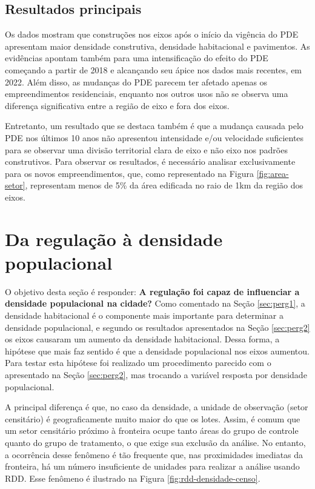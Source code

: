 \subsection{Resultados principais}

Os dados mostram que construções nos eixos após o início da vigência do PDE apresentam maior densidade construtiva, densidade habitacional e pavimentos. As evidências apontam também para uma intensificação do efeito do PDE começando a partir de 2018 e alcançando seu ápice nos dados mais recentes, em 2022. Além disso, as mudanças do PDE parecem ter afetado apenas os empreendimentos residenciais, enquanto nos outros usos não se observa uma diferença significativa entre a região de eixo e fora dos eixos.

Entretanto, um resultado que se destaca também é que a mudança causada pelo PDE nos últimos 10 anos não apresentou intensidade e/ou velocidade suficientes para se observar uma divisão territorial clara de eixo e não eixo nos padrões construtivos. Para observar os resultados, é necessário analisar exclusivamente para os novos empreendimentos, que, como representado na Figura \ref{fig:area-setor}, representam menos de 5\% da área edificada no raio de 1km da região dos eixos. 

\clearpage
\section{Da regulação à densidade populacional}
\label{sec:perg3}

O objetivo desta seção é responder: \textbf{A regulação foi capaz de influenciar a densidade populacional na cidade?} Como comentado na Seção \ref{sec:perg1}, a densidade habitacional é o componente mais importante para determinar a densidade populacional, e segundo os resultados apresentados na Seção \ref{sec:perg2} os eixos causaram um aumento da densidade habitacional. Dessa forma, a hipótese que mais faz sentido é que a densidade populacional nos eixos aumentou. Para testar esta hipótese foi realizado um procedimento parecido com o apresentado na Seção \ref{sec:perg2}, mas trocando a variável resposta por densidade populacional.

A principal diferença é que, no caso da densidade, a unidade de observação (setor censitário) é geograficamente muito maior do que os lotes. Assim, é comum que um setor censitário próximo à fronteira ocupe tanto áreas do grupo de controle quanto do grupo de tratamento, o que exige sua exclusão da análise. No entanto, a ocorrência desse fenômeno é tão frequente que, nas proximidades imediatas da fronteira, há um número insuficiente de unidades para realizar a análise usando RDD. Esse fenômeno é ilustrado na Figura \ref{fig:rdd-densidade-censo}. 

